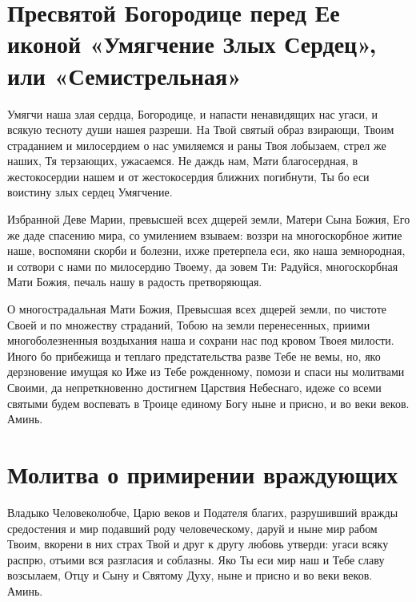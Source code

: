 \section{Пресвятой Богородице перед Ее иконой «Умягчение Злых Сердец», или  «Семистрельная»}\begin{mymulticols}
 


Умягчи наша злая сердца, Богородице, и напасти ненавидящих нас угаси, и всякую тесноту души нашея разреши. Hа Твой святый образ взирающи, Твоим страданием и милосердием о нас умиляемся и раны Твоя лобызаем, стрел же наших, Тя терзающих, ужасаемся. Не даждь нам, Мати благосердная, в жестокосердии нашем и от жестокосердия ближних погибнути, Ты бо еси воистину злых сердец Умягчение.


Избранной Деве Марии, превысшей всех дщерей земли, Матери Сына Божия, Его же даде спасению мира, со умилением взываем: воззри на многоскорбное житие наше, воспомяни скорби и болезни, ихже претерпела еси, яко наша земнородная, и сотвори с нами по милосердию Твоему, да зовем Ти: Радуйся, многоскорбная Мати Божия, печаль нашу в радость претворяющая.


О многострадальная Мати Божия, Превысшая всех дщерей земли, по чистоте Своей и по множеству страданий, Тобою на земли перенесенных, приими многоболезненныя воздыхания наша и сохрани нас под кровом Твоея милости. Иного бо прибежища и теплаго предстательства разве Тебе не вемы, но, яко дерзновение имущая ко Иже из Тебе рожденному, помози и спаси ны молитвами Своими, да непреткновенно достигнем Царствия Небеснаго, идеже со всеми святыми будем воспевать в Троице единому Богу ныне и присно, и во веки веков. Аминь.

\end{mymulticols}

\section{Молитва о примирении враждующих}\begin{mymulticols}
 

Владыко Человеколюбче, Царю веков и Подателя благих, разрушивший вражды средостения и мир подавший роду человеческому, даруй и ныне мир рабом Твоим, вкорени в них страх Твой и друг к другу любовь утверди: угаси всяку распрю, отъими вся разгласия и соблазны. Яко Ты еси мир наш и Тебе славу возсылаем, Отцу и Сыну и Святому Духу, ныне и присно и во веки веков. Аминь.

\end{mymulticols}

